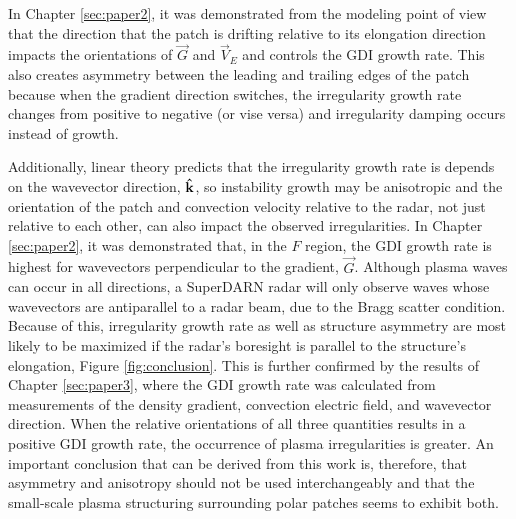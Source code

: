 

In Chapter \ref{sec:paper2}, it was demonstrated from the modeling point of view that the direction that the patch is drifting relative to its elongation direction impacts the orientations of \(\vec{G}\) and \(\vec{V}_E\) and controls the GDI growth rate.  This also creates asymmetry between the leading and trailing edges of the patch because when the gradient direction switches, the irregularity growth rate changes from positive to negative (or vise versa) and irregularity damping occurs instead of growth.  

Additionally, linear theory predicts that the irregularity growth rate is depends on the wavevector direction, \(\mathbf{\hat{k}}\), so instability growth may be anisotropic and the orientation of the patch and convection velocity relative to the radar, not just relative to each other, can also impact the observed irregularities.  In Chapter \ref{sec:paper2}, it was demonstrated that, in the \(F\) region, the GDI growth rate is highest for wavevectors perpendicular to the gradient, \(\vec{G}\).  Although plasma waves can occur in all directions, a SuperDARN radar will only observe waves whose wavevectors are antiparallel to a radar beam, due to the Bragg scatter condition.  Because of this, irregularity growth rate as well as structure asymmetry are most likely to be maximized if the radar's boresight is parallel to the structure's elongation, Figure \ref{fig:conclusion}.  This is further confirmed by the results of Chapter \ref{sec:paper3}, where the GDI growth rate was calculated from measurements of the density gradient, convection electric field, and wavevector direction.  When the relative orientations of all three quantities results in a positive GDI growth rate, the occurrence of plasma irregularities is greater.  An important conclusion that can be derived from this work is, therefore, that asymmetry and anisotropy should not be used interchangeably and that the small-scale plasma structuring surrounding polar patches seems to exhibit both.

